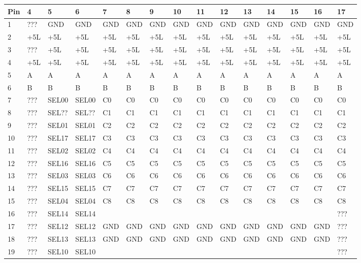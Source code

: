 \documentclass[hidelinks,11pt]{article}
\begin{document}
\pagebreak
\vfill
\noindent
\begin{tiny}%
  \begin{tabularx}{\textwidth}{|l|X|X|X|X|X|X|X|X|X|X|X|X|X|X|}
    \hline
    Pin & 4 & 5 & 6 & 7 & 8 & 9 & 10 & 11 & 12 & 13 & 14 & 15 & 16 & 17 \\
    \hline
    1 & ??? & GND & GND & GND & GND & GND & GND & GND & GND & GND & GND & GND & GND & GND \\
    2 & +5L & +5L & +5L & +5L & +5L & +5L & +5L & +5L & +5L & +5L & +5L & +5L & +5L & +5L \\
    3 & ??? & +5L & +5L & +5L & +5L & +5L & +5L & +5L & +5L & +5L & +5L & +5L & +5L & +5L \\
    4 & +5L & +5L & +5L & +5L & +5L & +5L & +5L & +5L & +5L & +5L & +5L & +5L & +5L & +5L \\
    5 & A & A & A & A & A & A & A & A & A & A & A & A & A & A \\
    6 & B & B & B & B & B & B & B & B & B & B & B & B & B & B \\
    7 & ??? & SEL00 & SEL00 & C0 & C0 & C0 & C0 & C0 & C0 & C0 & C0 & C0 & C0 & C0 \\
    8 & ??? & SEL?? & SEL?? & C1 & C1 & C1 & C1 & C1 & C1 & C1 & C1 & C1 & C1 & C1 \\
    9 & ??? & SEL01 & SEL01 & C2 & C2 & C2 & C2 & C2 & C2 & C2 & C2 & C2 & C2 & C2 \\
    10 & ??? & SEL17 & SEL17 & C3 & C3 & C3 & C3 & C3 & C3 & C3 & C3 & C3 & C3 & C3 \\
    11 & ??? & SEL02 & SEL02 & C4 & C4 & C4 & C4 & C4 & C4 & C4 & C4 & C4 & C4 & C4 \\
    12 & ??? & SEL16 & SEL16 & C5 & C5 & C5 & C5 & C5 & C5 & C5 & C5 & C5 & C5 & C5 \\
    13 & ??? & SEL03 & SEL03 & C6 & C6 & C6 & C6 & C6 & C6 & C6 & C6 & C6 & C6 & C6 \\
    14 & ??? & SEL15 & SEL15 & C7 & C7 & C7 & C7 & C7 & C7 & C7 & C7 & C7 & C7 & C7 \\
    15 & ??? & SEL04 & SEL04 & C8 & C8 & C8 & C8 & C8 & C8 & C8 & C8 & C8 & C8 & C8 \\
    16 & ??? & SEL14 & SEL14 & & & & & & & & & & & ??? \\
    17 & ??? & SEL12 & SEL12 & GND & GND & GND & GND & GND & GND & GND & GND & GND & GND & ??? \\
    18 & ??? & SEL13 & SEL13 & GND & GND & GND & GND & GND & GND & GND & GND & GND & GND & ??? \\
    19 & ??? & SEL10 & SEL10 & & & & & & & & & & & ??? \\

\end{tabularx}
\end{tiny}
\end{document}
